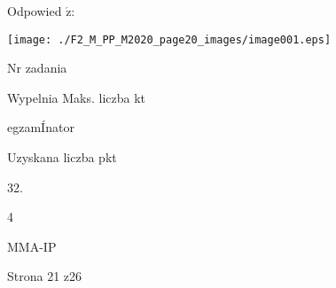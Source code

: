 \documentclass[a4paper,12pt]{article}
\begin{document}
Odpowied $\acute{\mathrm{z}}$:
\begin{center}
\texttt{[image: ./F2\_M\_PP\_M2020\_page20\_images/image001.eps]}
\end{center}
Nr zadania

Wypelnia Maks. liczba kt

egzamÍnator

Uzyskana liczba pkt

32.

4

MMA-IP

Strona 21 z26
\end{document}
